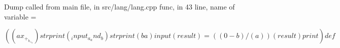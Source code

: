 \documentclass{article}
\begin{document}
Dump called from main file, in src/lang/lang.cpp func, in 43 line, name of variable = 


$$
((ax_+_b_=_0) strprint (_input_a_and_b) strprint (ba) input (result) = ((0 - b) / (a))(result) print ) def 
$$
\end{document}
